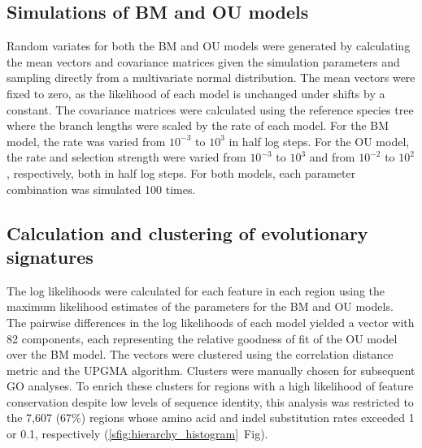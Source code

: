 \subsection{Simulations of BM and OU models}
Random variates for both the BM and OU models were generated by calculating the mean vectors and covariance matrices given the simulation parameters and sampling directly from a multivariate normal distribution. The mean vectors were fixed to zero, as the likelihood of each model is unchanged under shifts by a constant. The covariance matrices were calculated using the reference species tree where the branch lengths were scaled by the rate of each model. For the BM model, the rate was varied from $10^{-3}$ to $10^3$ in half log steps. For the OU model, the rate and selection strength were varied from $10^{-3}$ to $10^3$ and from $10^{-2}$ to $10^2$, respectively, both in half log steps. For both models, each parameter combination was simulated 100 times.

\subsection{Calculation and clustering of evolutionary signatures}
The log likelihoods were calculated for each feature in each region using the maximum likelihood estimates of the parameters for the BM and OU models. The pairwise differences in the log likelihoods of each model yielded a vector with 82 components, each representing the relative goodness of fit of the OU model over the BM model. The vectors were clustered using the correlation distance metric and the UPGMA algorithm. Clusters were manually chosen for subsequent GO analyses. To enrich these clusters for regions with a high likelihood of feature conservation despite low levels of sequence identity, this analysis was restricted to the 7,607 (67\%) regions whose amino acid and indel substitution rates exceeded 1 or 0.1, respectively (\ref{sfig:hierarchy_histogram}~Fig).

